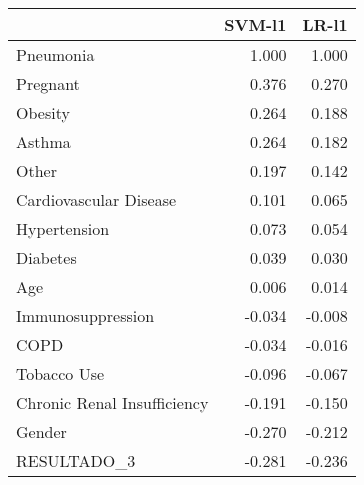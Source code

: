 \begin{tabular}{lrr}
\toprule
{} &  SVM-l1 &  LR-l1 \\
\midrule
Pneumonia                   &   1.000 &  1.000 \\
Pregnant                    &   0.376 &  0.270 \\
Obesity                     &   0.264 &  0.188 \\
Asthma                      &   0.264 &  0.182 \\
Other                       &   0.197 &  0.142 \\
Cardiovascular Disease      &   0.101 &  0.065 \\
Hypertension                &   0.073 &  0.054 \\
Diabetes                    &   0.039 &  0.030 \\
Age                         &   0.006 &  0.014 \\
Immunosuppression           &  -0.034 & -0.008 \\
COPD                        &  -0.034 & -0.016 \\
Tobacco Use                 &  -0.096 & -0.067 \\
Chronic Renal Insufficiency &  -0.191 & -0.150 \\
Gender                      &  -0.270 & -0.212 \\
RESULTADO\_3                 &  -0.281 & -0.236 \\
\bottomrule
\end{tabular}
